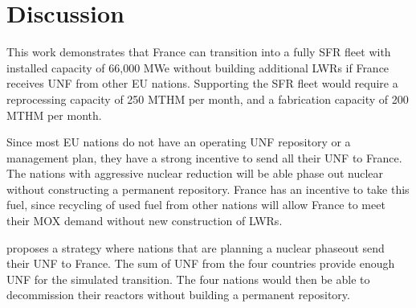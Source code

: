 \section{Discussion}
This work demonstrates that France can transition into
a fully \gls{SFR} fleet with installed capacity of 66,000 MWe without
building additional \glspl{LWR}
if France receives \gls{UNF} from other \gls{EU} nations.
Supporting the \gls{SFR} fleet would require a reprocessing capacity of 250 MTHM per month,
and a fabrication capacity of 200 MTHM per month.

Since most \gls{EU} nations do not have an operating \gls{UNF}
repository or a management plan, they have a strong incentive
to send all their \gls{UNF} to France. The nations
with aggressive nuclear reduction will be able phase out nuclear
without constructing a permanent repository. France has an
incentive to take this fuel, since recycling of used fuel from
other nations will allow France to meet their MOX demand
without new construction of \glspl{LWR}.

 proposes a strategy where nations
that are planning a nuclear phaseout send their \gls{UNF}
to France. The sum of \gls{UNF} from the four countries
provide enough \gls{UNF} for the simulated transition.
The four nations would then be able to decommission
their reactors without building a permanent repository. 

